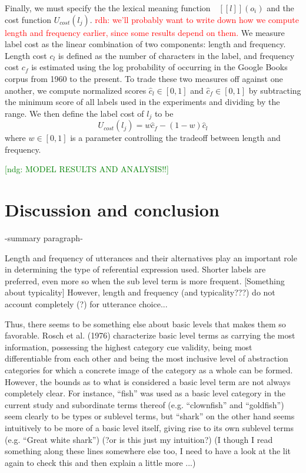 \documentclass[10pt,letterpaper]{article}
\newcommand{\red}[1]{\textcolor{Red}{#1}}
\newcommand{\ndg}[1]{\textcolor{Green}{[ndg: #1]}}
\newcommand{\denote}[1]{\mbox{ $[\![ #1 ]\!]$}}
\begin{document}
Finally, we must specify the the lexical meaning function $\denote{l}(o_i)$ and the cost function $U_{cost}(l_j)$. 
\red{rdh: we'll probably want to write down how we compute length and frequency earlier, since some results depend on them.}
We measure label cost as the linear combination of two components: length and frequency. Length cost $c_l$ is defined as the number of characters in the label, and frequency cost $c_f$ is estimated using the log probability of occurring in the Google Books corpus from 1960 to the present. To trade these two measures off against one another, we compute normalized scores $\hat{c}_l \in [0,1]$ and $\hat{c}_f \in [0,1]$ by subtracting the minimum score of all labels used in the experiments and dividing by the range. We then define the label cost of $l_j$ to be $$U_{cost}(l_j) = w\hat{c}_f - (1-w)\hat{c}_l$$ where $w \in [0,1]$ is a parameter controlling the tradeoff between length and frequency.


\ndg{MODEL RESULTS AND ANALYSIS!!}


\section{\bf Discussion and conclusion}

-summary paragraph- 

Length and frequency of utterances and their alternatives play an important role in determining the type of referential expression used. Shorter labels are preferred, even more so when the sub level term is more frequent. [Something about typicality] However, length and frequency (and typicality???) do not account completely (?) for utterance choice...

Thus, there seems to be something else about basic levels that makes them so favorable. Rosch et al. (1976) characterize basic level terms as carrying the most information, possessing the highest category cue validity, being most differentiable from each other and being the most inclusive level of abstraction categories for which a concrete image of the category as a whole can be formed. However, the bounds as to what is considered a basic level term are not always completely clear. For instance, ``fish'' was used as a basic level category in the current study and subordinate terms thereof (e.g. ``clownfish'' and ``goldfish'') seem clearly to be types or sublevel terms, but ``shark'' on the other hand seems intuitively to be more of a basic level itself, giving rise to its own sublevel terms (e.g. ``Great white shark'') (?or is this just my intuition?) (I though I read something along these lines somewhere else too, I need to have a look at the lit again to check this and then explain a little more ...)
\end{document}
